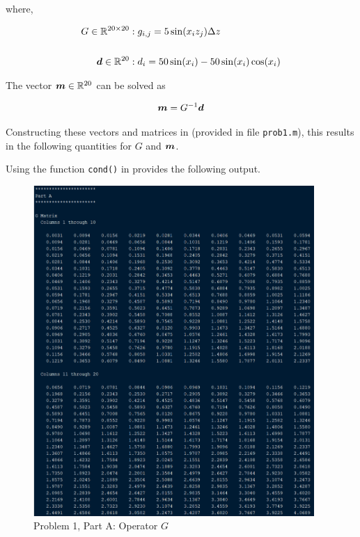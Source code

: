 where,

\begin{align*}
	G \in \mathbb{R}^{20 \times 20} &: g_{i,j} = 5 \sin(x_i z_j) \Delta z \\
	\\
	\boldsymbol{d} \in \mathbb{R}^{20} &: d_i = 50 \sin(x_i) - 50 \sin(x_i) \cos(x_i)
\end{align*}

The vector $\boldsymbol{m} \in \mathbb{R}^{20}$ can be solved as

\begin{align*}
	\boldsymbol{m} = G^{-1} \boldsymbol{d}
\end{align*}

Constructing these vectors and matrices in \MATLAB (provided in file \texttt{prob1.m}), this results in the following quantities for $G$ and $\boldsymbol{m}$.

Using the function \texttt{cond()} in \MATLAB provides the following output.

\begin{figure}[h] \label{fig: prob 1 part a G}
	\centering
	\includegraphics[width=0.95\textwidth]{./images/prob1_parta_G.png}
	\caption{Problem 1, Part A: Operator $G$}
\end{figure}
\FloatBarrier

